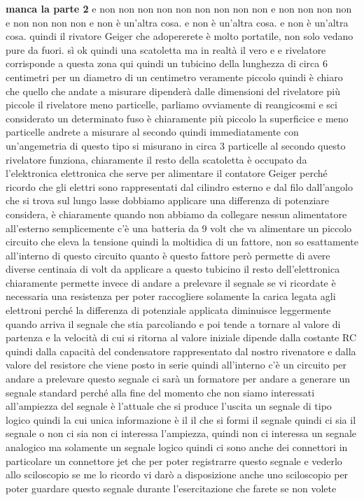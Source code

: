 \textbf{manca la parte 2}
e non non non non non non non non non e non non non non e non non non non e non è un'altra cosa. e non è un'altra cosa. e non è un'altra cosa. quindi il rivatore Geiger che adopererete è molto portatile, non solo vedano pure da fuori. sì ok quindi una scatoletta ma in realtà il vero e e rivelatore corrisponde a questa zona qui quindi un tubicino della lunghezza di circa 6 centimetri per un diametro di un centimetro veramente piccolo quindi è chiaro che quello che andate a misurare dipenderà dalle dimensioni del rivelatore più piccole il rivelatore meno particelle, parliamo ovviamente di reangicosmi e sci considerato un determinato fuso è chiaramente più piccolo la superficice e meno particelle andrete a misurare al secondo quindi immediatamente con un'angemetria di questo tipo si misurano in circa 3 particelle al secondo questo rivelatore funziona, chiaramente il resto della scatoletta è occupato da l'elektronica elettronica che serve per alimentare il contatore Geiger perché ricordo che gli elettri sono rappresentati dal cilindro esterno e dal filo dall'angolo che si trova sul lungo lasse dobbiamo applicare una differenza di potenziare considera, è chiaramente quando non abbiamo da collegare nessun alimentatore all'esterno semplicemente c'è una batteria da 9 volt che va alimentare un piccolo circuito che eleva la tensione quindi la moltidica di un fattore, non so esattamente all'interno di questo circuito quanto è questo fattore però permette di avere diverse centinaia di volt da applicare a questo tubicino il resto dell'elettronica chiaramente permette invece di andare a prelevare il segnale se vi ricordate è necessaria una resistenza per poter raccogliere solamente la carica legata agli elettroni perché la differenza di potenziale applicata diminuisce leggermente quando arriva il segnale che stia parcoliando e poi tende a tornare al valore di partenza e la velocità di cui si ritorna al valore iniziale dipende dalla costante RC quindi dalla capacità del condensatore rappresentato dal nostro rivenatore e dalla valore del resistore che viene posto in serie quindi all'interno c'è un circuito per andare a prelevare questo segnale ci sarà un formatore per andare a generare un segnale standard perché alla fine del momento che non siamo interessati all'ampiezza del segnale è l'attuale che si produce l'uscita un segnale di tipo logico quindi la cui unica informazione è il il che si formi il segnale quindi ci sia il segnale o non ci sia non ci interessa l'ampiezza, quindi non ci interessa un segnale analogico ma solamente un segnale logico quindi ci sono anche dei connettori in particolare un connettore jet che per poter registrarre questo segnale e vederlo allo sciloscopio se me lo ricordo vi darò a disposizione anche uno sciloscopio per poter guardare questo segnale durante l'esercitazione che farete se non volete 

